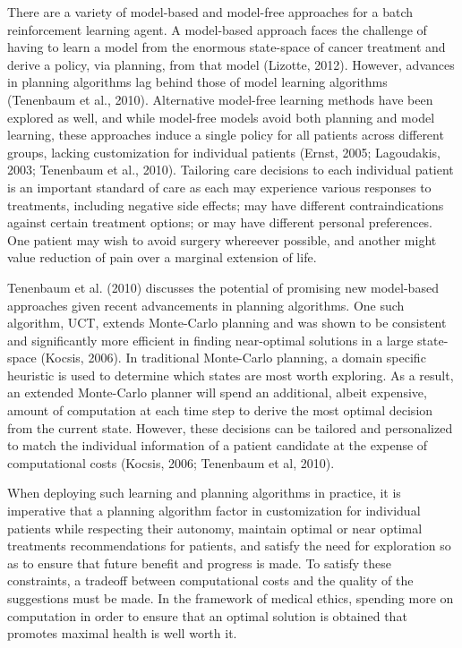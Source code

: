 \documentclass[]{spie}  %
\begin{document}
There are a variety of model-based and model-free approaches for a batch reinforcement learning agent. A model-based approach faces the challenge of having to learn a model from the enormous state-space of cancer treatment and derive a policy, via planning, from that model (Lizotte, 2012). However, advances in planning algorithms lag behind those of model learning algorithms (Tenenbaum et al., 2010). Alternative model-free learning methods have been explored as well, and while model-free models avoid both planning and model learning, these approaches induce a single policy for all patients across different groups, lacking customization for individual patients (Ernst, 2005; Lagoudakis, 2003; Tenenbaum et al., 2010). Tailoring care decisions to each individual patient is an important standard of care as each may experience various responses to treatments, including negative side effects; may have different contraindications against certain treatment options; or may have different personal preferences. One patient may wish to avoid surgery whereever possible, and another might value reduction of pain over a marginal extension of life.

Tenenbaum et al. (2010) discusses the potential of promising new model-based approaches given recent advancements in planning algorithms. One such algorithm, UCT, extends Monte-Carlo planning and was shown to be consistent and significantly more efficient in finding near-optimal solutions in a large state-space (Kocsis, 2006). In traditional Monte-Carlo planning, a domain specific heuristic is used to determine which states are most worth exploring. As a result, an extended Monte-Carlo planner will spend an additional, albeit expensive, amount of computation at each time step to derive the most optimal decision from the current state. However, these decisions can be tailored and personalized to match the individual information of a patient candidate at the expense of computational costs (Kocsis, 2006; Tenenbaum et al, 2010).

When deploying such learning and planning algorithms in practice, it is imperative that a planning algorithm factor in customization for individual patients while respecting their autonomy, maintain optimal or near optimal treatments recommendations for patients, and satisfy the need for exploration so as to ensure that future benefit and progress is made. To satisfy these constraints, a tradeoff between computational costs and the quality of the suggestions must be made. In the framework of medical ethics, spending more on computation in order to ensure that an optimal solution is obtained that promotes maximal health is well worth it.
\end{document}
